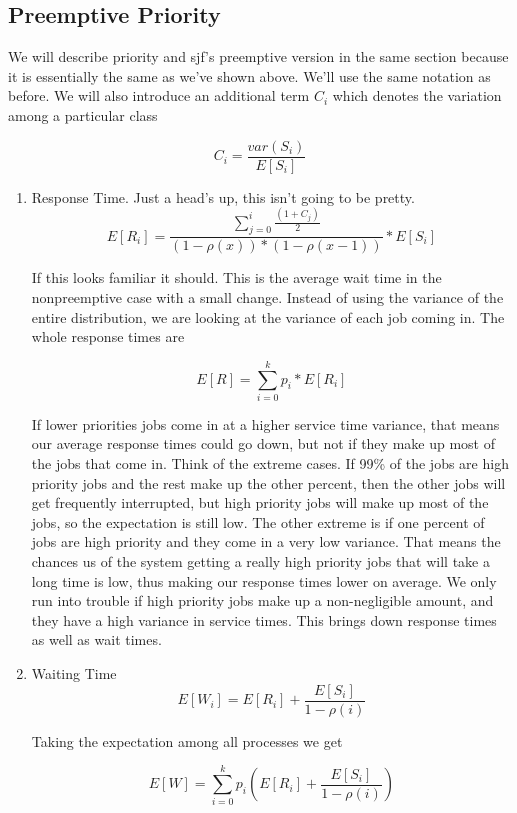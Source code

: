 \subsection{Preemptive Priority}

We will describe priority and sjf's preemptive version in the same section because it is essentially the same as we've shown above.
We'll use the same notation as before.
We will also introduce an additional term $C_i$ which denotes the variation among a particular class

\[
    C_i = \frac{var(S_i)}{E[S_i]}
\]

\begin{enumerate}
\item Response Time. Just a head's up, this isn't going to be pretty.
  \[
  E[R_i] = \frac{\sum\limits_{j=0}^i\frac{(1 + C_j)}{2}}{(1 - \rho(x))*( 1 - \rho(x-1))} * E[S_i]
  \]

  If this looks familiar it should.
  This is the average wait time in the nonpreemptive case with a small change. Instead of using the variance of the entire distribution, we are looking at the variance of each job coming in.
  The whole response times are

  \[
     E[R] = \sum\limits_{i = 0}^k p_i * E[R_i]
  \]

  If lower priorities jobs come in at a higher service time variance, that means our average response times could go down, but not if they make up most of the jobs that come in.
  Think of the extreme cases.
  If 99\% of the jobs are high priority jobs and the rest make up the other percent, then the other jobs will get frequently interrupted, but high priority jobs will make up most of the jobs, so the expectation is still low.
  The other extreme is if one percent of jobs are high priority and they come in a very low variance.
  That means the chances us of the system getting a really high priority jobs that will take a long time is low, thus making our response times lower on average.
  We only run into trouble if high priority jobs make up a non-negligible amount, and they have a high variance in service times.
  This brings down response times as well as wait times.

\item Waiting Time
  \[
  E[W_i] = E[R_i] + \frac{E[S_i]}{1 - \rho(i)}
  \]

  Taking the expectation among all processes we get

  \[
  E[W] = \sum\limits_{i = 0}^k p_i (E[R_i] + \frac{E[S_i]}{1 - \rho(i)})
  \]


\end{enumerate}
